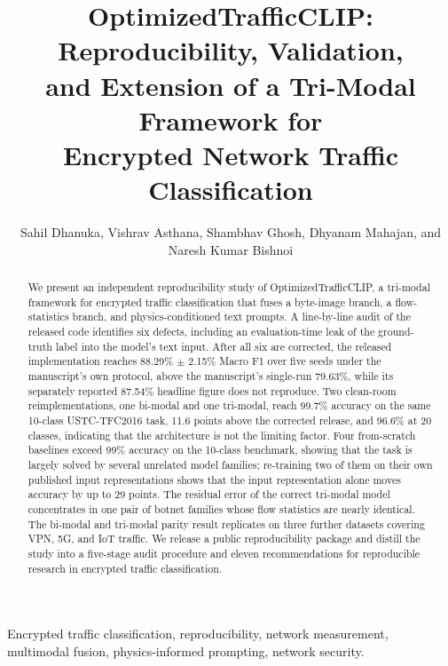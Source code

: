 \documentclass[journal]{IEEEtran}
\begin{document}
\title{OptimizedTrafficCLIP: Reproducibility, Validation,\\ and Extension of a Tri-Modal Framework for\\ Encrypted Network Traffic Classification}

\author{Sahil Dhanuka, Vishrav Asthana, Shambhav Ghosh, Dhyanam Mahajan, and Naresh Kumar Bishnoi}

\maketitle

\begin{abstract}
We present an independent reproducibility study of OptimizedTrafficCLIP, a tri-modal framework for encrypted traffic classification that fuses a byte-image branch, a flow-statistics branch, and physics-conditioned text prompts. A line-by-line audit of the released code identifies six defects, including an evaluation-time leak of the ground-truth label into the model's text input. After all six are corrected, the released implementation reaches 88.29\% $\pm$ 2.15\% Macro F1 over five seeds under the manuscript's own protocol, above the manuscript's single-run 79.63\%, while its separately reported 87.54\% headline figure does not reproduce. Two clean-room reimplementations, one bi-modal and one tri-modal, reach 99.7\% accuracy on the same 10-class USTC-TFC2016 task, 11.6 points above the corrected release, and 96.6\% at 20 classes, indicating that the architecture is not the limiting factor. Four from-scratch baselines exceed 99\% accuracy on the 10-class benchmark, showing that the task is largely solved by several unrelated model families; re-training two of them on their own published input representations shows that the input representation alone moves accuracy by up to 29 points. The residual error of the correct tri-modal model concentrates in one pair of botnet families whose flow statistics are nearly identical. The bi-modal and tri-modal parity result replicates on three further datasets covering VPN, 5G, and IoT traffic. We release a public reproducibility package and distill the study into a five-stage audit procedure and eleven recommendations for reproducible research in encrypted traffic classification.
\end{abstract}

\begin{IEEEkeywords}
Encrypted traffic classification, reproducibility, network measurement, multimodal fusion, physics-informed prompting, network security.
\end{IEEEkeywords}
\end{document}
